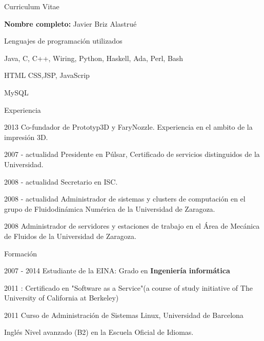 \begin{cv}{Curriculum Vitae}

\vspace{0.8cm}
\textbf{Nombre completo:} Javier Briz Alastrué
\vspace{0.8cm}

\begin{cvlist}{Lenguajes de programación utilizados}
\item Java, C, C++, Wiring, Python, Haskell, Ada, Perl, Bash
\item HTML CSS,JSP, JavaScrip
\item MySQL
\end{cvlist}

\begin{cvlist}{Experiencia}

	\item[2013] Co-fundador de Prototyp3D y FaryNozzle. Experiencia en el ambito de la impresión 3D.
	\item[2007 - actualidad] Presidente en Púlsar, Certificado de servicios distinguidos de la Universidad.
	\item[2008 - actualidad] Secretario en ISC.
	\item[2008 - actualidad] Administrador de sistemas y clusters de computación en el grupo de Fluidodinámica Numérica de la Universidad de Zaragoza.
	\item[2008] Administrador de servidores y estaciones de trabajo en el Área de Mecánica de Fluidos de la Universidad de Zaragoza.

\end{cvlist}

\begin{cvlist}{Formación}

	\item[2007 - 2014] Estudiante de la EINA: Grado en \textbf{Ingeniería informática}
	\item[2011]: Certificado en "Software as a Service"(a course of study initiative of The University of California at Berkeley) 
	\item [2011] Curso de Administración de Sistemas Linux, Universidad de Barcelona
	\item [Inglés] Nivel avanzado (B2) en la Escuela Oficial de Idiomas.

\end{cvlist}

\end{cv}
